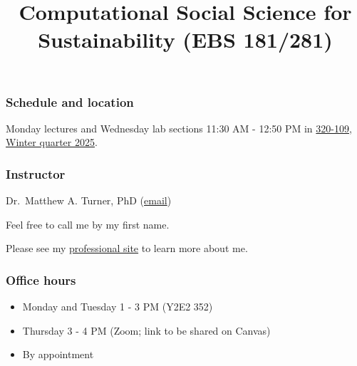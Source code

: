 \documentclass[letterpaper]{article}
\title{Computational Social Science for Sustainability (EBS 181/281)}
\author{}
\date{}
\providecommand{\tightlist}{%
  \setlength{\itemsep}{0pt}\setlength{\parskip}{0pt}}
\begin{document}
\maketitle


\vspace{-0.5in}
\subsubsection{Schedule and location}\label{schedule-and-location}

Monday lectures and Wednesday lab sections 11:30 AM - 12:50 PM in
\href{https://campus-map.stanford.edu/?srch=320-109\#}{320-109},
\href{https://studentservices.stanford.edu/calendar/academic-dates/stanford-academic-calendar-2024-2025\#winter25}{Winter
quarter 2025}.

\subsubsection{Instructor}\label{instructor}

Dr.~Matthew A. Turner, PhD (\href{mailto:maturner@stanford.edu}{email})

Feel free to call me by my first name.

Please see my \href{https://mt.digital}{professional site} to learn more
about me.

\subsubsection{Office hours}\label{office-hours}

\begin{itemize}
\tightlist
\item
  Monday and Tuesday 1 - 3 PM (Y2E2 352)
\item
  Thursday 3 - 4 PM (Zoom; link to be shared on Canvas)
\item
  By appointment
\end{itemize}
\end{document}
